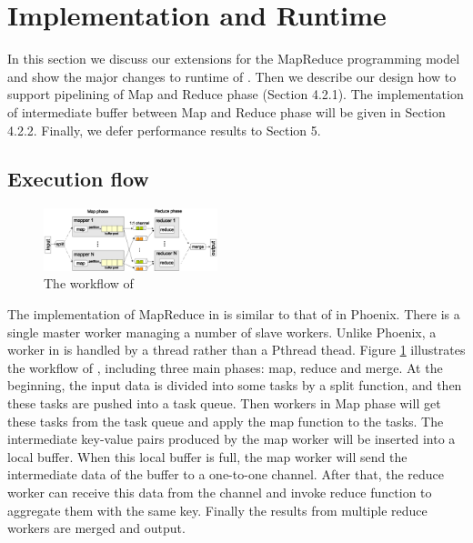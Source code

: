 \section{Implementation and Runtime}
\label{sec:runtime}
In this section we discuss our extensions for the MapReduce programming model and show the major changes to runtime of \myds. 
Then we describe our design how to support pipelining of Map and Reduce phase (Section 4.2.1).
The implementation of intermediate buffer between Map and Reduce phase will be given in Section 4.2.2.
Finally, we defer performance results to Section 5.



\subsection{Execution flow}
\begin{figure}[!h!t]  
    \centering
    \includegraphics[width=0.45\textwidth]{eps/dmr_workflow.eps}
    \caption{The workflow of \myds}
    \label{fig:dmr:workflow}
\end{figure}

The implementation of MapReduce in  \myds is similar to that of in Phoenix. 
There is a single master worker managing a number of slave workers. Unlike Phoenix,  a worker in \myds is handled by a \myth thread rather than a Pthread thead.
Figure \ref{fig:dmr:workflow} illustrates the workflow of \myds, including three main phases: map, reduce and merge. 
At the beginning,  the input data is divided into some tasks by a split function, and then these tasks are pushed  into a task queue. 
Then workers in Map phase will get these tasks from the task queue and apply the map function to the tasks.
The intermediate key-value pairs produced by the map worker will be inserted into a local buffer.
When this local buffer is full, the map worker will send the intermediate data of the buffer to a one-to-one channel.
After that, the reduce worker can receive this data from the channel and invoke reduce function to aggregate them with the same key.  
Finally the results from multiple reduce workers are merged and output.

